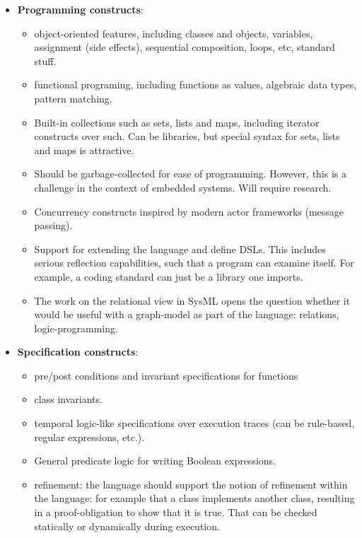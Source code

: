 \documentclass{llncs}
\begin{document}
\begin{itemize}
  \item \textbf{Programming constructs}:
    \begin{itemize}
      \item object-oriented features, including classes and objects,
        variables, assignment (side effects), sequential composition,
        loops, etc, standard stuff.
      \item functional programing, including functions as values,
        algebraic data types, pattern matching.
      \item Built-in collections such as sets, lists and maps,
        including iterator constructs over such.  Can be libraries,
        but special syntax for sets, lists and maps is attractive.
      \item Should be garbage-collected for ease of
        programming. However, this is a challenge in the context of
        embedded systems. Will require research.
      \item Concurrency constructs inspired by modern actor frameworks
        (message passing).
      \item Support for extending the language and define DSLs. This
        includes serious reflection capabilities, such that a program
        can examine itself. For example, a coding standard can just be
        a library one imports.
      \item The work on the relational view in SysML opens the
        question whether it would be useful with a graph-model as part
        of the language: relations, logic-programming.
    \end{itemize}
 
  \item \textbf{Specification constructs}:
    \begin{itemize}
      \item pre/post conditions and invariant specifications for functions
      \item class invariants.
      \item temporal logic-like specifications over execution traces
        (can be rule-based, regular expressions, etc.).
      \item General predicate logic for writing Boolean expressions.
      \item refinement: the language should support the notion of
        refinement within the language: for example that a class
        implements another class, resulting in a proof-obligation to
        show that it is true. That can be checked statically or
        dynamically during execution.
    \end{itemize}
\end{itemize}
\end{document}
